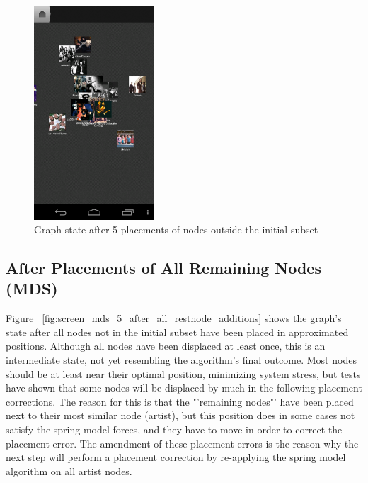 \begin{figure}[H]
  \centering
    \includegraphics[width=0.4\textwidth]{figures/screen_mds_4_after_5_restnode_additions}
  \caption{Graph state after 5 placements of nodes outside the initial subset}
  \label{fig:screen_mds_4_after_5_restnode_additions}
\end{figure}

\newpage
\subsection{After Placements of All Remaining Nodes (MDS)}

Figure ~\ref{fig:screen_mds_5_after_all_restnode_additions} shows the graph's state after all nodes not in the initial subset have been placed in approximated positions. Although all nodes have been displaced at least once, this is an intermediate state, not yet resembling the algorithm's final outcome. Most nodes should be at least near their optimal position, minimizing system stress, but tests have shown that some nodes will be displaced by much in the following placement corrections. The reason for this is that the "'remaining nodes"' have been placed next to their most similar node (artist), but this position does in some cases not satisfy the spring model forces, and they have to move in order to correct the placement error. The amendment of these placement errors is the reason why the next step will perform a placement correction by re-applying the spring model algorithm on all artist nodes.

